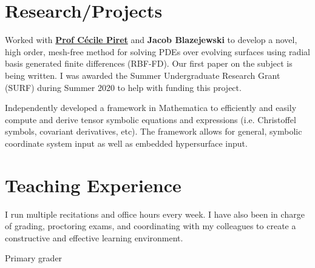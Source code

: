 \documentclass[letterpaper]{deedy-resume} %
\begin{document}
\begin{minipage}[t]{0.63\textwidth} %


\section{Research/Projects}


Worked with \textbf{\href{https://www.mtu.edu/math/department/faculty-staff/faculty/piret/}{Prof C\'ecile Piret}} and \textbf{Jacob Blazejewski} to develop a novel, high order, mesh-free method for solving PDEs over evolving surfaces using radial basis generated finite differences (RBF-FD). Our first paper on the subject is being written. I was awarded the Summer Undergraduate Research Grant (SURF) during Summer 2020 to help with funding this project.

\sectionspace

Independently developed a framework in Mathematica to efficiently and easily compute and derive tensor symbolic equations and expressions (i.e. Christoffel symbols, covariant derivatives, etc). The framework allows for general, symbolic coordinate system input as well as embedded hypersurface input.


\section{Teaching Experience}
I run multiple recitations and office hours every week. I have also been in charge of grading, proctoring exams, and coordinating with my colleagues to create a constructive and effective learning environment.

\sectionspace

Primary grader


\end{minipage}
\end{document}
